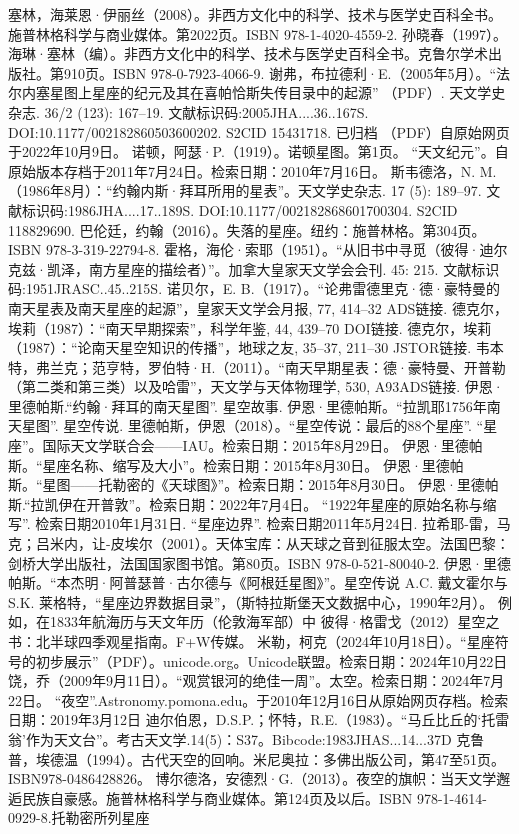 \begin{itemize}
 塞林，海莱恩·伊丽丝（2008）。非西方文化中的科学、技术与医学史百科全书。施普林格科学与商业媒体。第2022页。ISBN 978-1-4020-4559-2.
 孙晓春（1997）。海琳·塞林（编）。非西方文化中的科学、技术与医学史百科全书。克鲁尔学术出版社。第910页。ISBN 978-0-7923-4066-9.
 谢弗，布拉德利·E.（2005年5月）。“法尔内塞星图上星座的纪元及其在喜帕恰斯失传目录中的起源” （PDF）. 天文学史杂志. 36/2 (123): 167–19. 文献标识码:2005JHA....36..167S. DOI:10.1177/002182860503600202. S2CID 15431718. 已归档 （PDF）自原始网页于2022年10月9日。
 诺顿，阿瑟·P.（1919）。诺顿星图。第1页。
 “天文纪元”。自原始版本存档于2011年7月24日。检索日期：2010年7月16日。
 斯韦德洛，N. M.（1986年8月）：“约翰内斯·拜耳所用的星表”。天文学史杂志. 17 (5): 189–97. 文献标识码:1986JHA....17..189S. DOI:10.1177/002182868601700304. S2CID 118829690.
 巴伦廷，约翰（2016）。失落的星座。纽约：施普林格。第304页。ISBN 978-3-319-22794-8.
 霍格，海伦·索耶（1951）。“从旧书中寻觅（彼得·迪尔克兹·凯泽，南方星座的描绘者）”。加拿大皇家天文学会会刊. 45: 215. 文献标识码:1951JRASC..45..215S.
 诺贝尔，E. B.（1917）。“论弗雷德里克·德·豪特曼的南天星表及南天星座的起源”，皇家天文学会月报, 77, 414–32 ADS链接.
 德克尔，埃莉（1987）：“南天早期探索”，科学年鉴, 44, 439–70 DOI链接.
 德克尔，埃莉（1987）：“论南天星空知识的传播”，地球之友, 35–37, 211–30 JSTOR链接.
 韦本特，弗兰克；范亨特，罗伯特·H.（2011）。“南天早期星表：德·豪特曼、开普勒（第二类和第三类）以及哈雷”，天文学与天体物理学, 530, A93ADS链接.
 伊恩·里德帕斯.“约翰·拜耳的南天星图”. 星空故事.
 伊恩·里德帕斯。“拉凯耶1756年南天星图”. 星空传说.
 里德帕斯，伊恩（2018）。“星空传说：最后的88个星座”.
 “星座”。国际天文学联合会——IAU。检索日期：2015年8月29日。
 伊恩·里德帕斯。“星座名称、缩写及大小”。检索日期：2015年8月30日。
 伊恩·里德帕斯。“星图——托勒密的《天球图》”。检索日期：2015年8月30日。
 伊恩·里德帕斯.“拉凯伊在开普敦”。检索日期：2022年7月4日。
 “1922年星座的原始名称与缩写”. 检索日期2010年1月31日.
 “星座边界”. 检索日期2011年5月24日.
 拉希耶-雷，马克；吕米内，让-皮埃尔（2001）。天体宝库：从天球之音到征服太空。法国巴黎：剑桥大学出版社，法国国家图书馆。第80页。ISBN 978-0-521-80040-2.
 伊恩·里德帕斯。“本杰明·阿普瑟普·古尔德与《阿根廷星图》”。星空传说
 A.C. 戴文霍尔与S.K. 莱格特，“星座边界数据目录”，（斯特拉斯堡天文数据中心，1990年2月）。
 例如，在1833年航海历与天文年历（伦敦海军部）中
 彼得·格雷戈（2012）星空之书：北半球四季观星指南。F+W传媒。
 米勒，柯克（2024年10月18日）。“星座符号的初步展示”（PDF）。unicode.org。Unicode联盟。检索日期：2024年10月22日
 饶，乔（2009年9月11日）。“观赏银河的绝佳一周”。太空。检索日期：2024年7月22日。
 “夜空”.Astronomy.pomona.edu。于2010年12月16日从原始网页存档。检索日期：2019年3月12日
 迪尔伯恩，D.S.P.；怀特，R.E.（1983）。“马丘比丘的‘托雷翁’作为天文台”。考古天文学.14(5)：S37。Bibcode:1983JHAS...14...37D
 克鲁普，埃德温（1994）。古代天空的回响。米尼奥拉：多佛出版公司，第47至51页。ISBN978-0486428826。
 博尔德洛，安德烈·G.（2013）。夜空的旗帜：当天文学邂逅民族自豪感。施普林格科学与商业媒体。第124页及以后。ISBN 978-1-4614-0929-8.托勒密所列星座  
\end{itemize}
